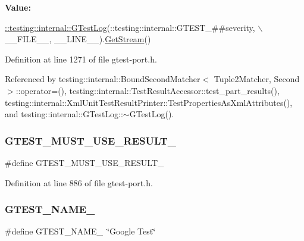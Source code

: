 {\bfseries Value\+:}
\begin{DoxyCode}
\hyperlink{classtesting_1_1internal_1_1GTestLog}{::testing::internal::GTestLog}(::testing::internal::GTEST\_##severity, \(\backslash\)
                                  \_\_FILE\_\_, \_\_LINE\_\_).\hyperlink{classtesting_1_1internal_1_1GTestLog_aebb92e67d98eca69f0347d5121dab27a}{GetStream}()
\end{DoxyCode}


Definition at line 1271 of file gtest-\/port.\+h.



Referenced by testing\+::internal\+::\+Bound\+Second\+Matcher$<$ Tuple2\+Matcher, Second $>$\+::operator=(), testing\+::internal\+::\+Test\+Result\+Accessor\+::test\+\_\+part\+\_\+results(), testing\+::internal\+::\+Xml\+Unit\+Test\+Result\+Printer\+::\+Test\+Properties\+As\+Xml\+Attributes(), and testing\+::internal\+::\+G\+Test\+Log\+::$\sim$\+G\+Test\+Log().

\mbox{\label{gtest-port_8h_a8e5aab8276b2645f64f41c9e3021b935}} 
\subsubsection{\texorpdfstring{G\+T\+E\+S\+T\+\_\+\+M\+U\+S\+T\+\_\+\+U\+S\+E\+\_\+\+R\+E\+S\+U\+L\+T\+\_\+}{GTEST\_MUST\_USE\_RESULT\_}}
{\footnotesize\ttfamily \#define G\+T\+E\+S\+T\+\_\+\+M\+U\+S\+T\+\_\+\+U\+S\+E\+\_\+\+R\+E\+S\+U\+L\+T\+\_\+}



Definition at line 886 of file gtest-\/port.\+h.

\mbox{\label{gtest-port_8h_a13d98c217176bd8722c395b9225fc19d}} 
\subsubsection{\texorpdfstring{G\+T\+E\+S\+T\+\_\+\+N\+A\+M\+E\+\_\+}{GTEST\_NAME\_}}
{\footnotesize\ttfamily \#define G\+T\+E\+S\+T\+\_\+\+N\+A\+M\+E\+\_\+~\char`\"{}Google Test\char`\"{}}



